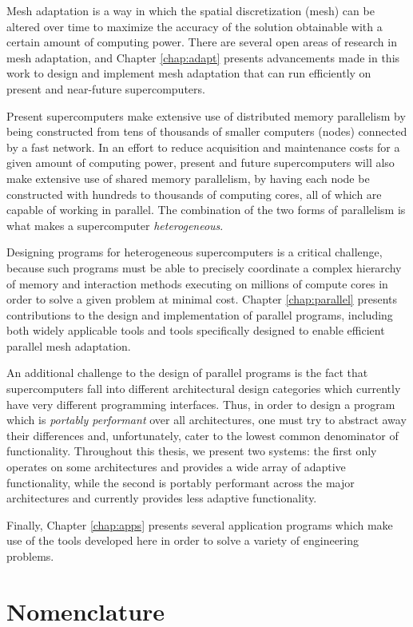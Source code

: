 Mesh adaptation is a way in which the spatial discretization
(mesh) can be altered over time to maximize the accuracy
of the solution obtainable with a certain amount
of computing power.
There are several open areas of research in mesh adaptation,
and Chapter \ref{chap:adapt} presents advancements
made in this work to design and implement
mesh adaptation that can run efficiently on present
and near-future supercomputers.

Present supercomputers make extensive use of distributed
memory parallelism by being constructed from tens of thousands of
smaller computers (nodes) connected by a fast network.
In an effort to reduce acquisition and maintenance costs
for a given amount of computing power,
present and future supercomputers will also make extensive use
of shared memory parallelism, by having each node be constructed
with hundreds to thousands of computing cores, all of which
are capable of working in parallel.
The combination of the two forms of parallelism is what
makes a supercomputer \emph{heterogeneous}.

Designing programs for heterogeneous supercomputers is a critical
challenge, because such programs must be able to precisely coordinate
a complex hierarchy of memory and interaction methods executing on
millions of compute cores
in order to solve a given problem at minimal cost.
Chapter \ref{chap:parallel} presents contributions to
the design and implementation of parallel programs,
including both widely applicable tools and tools specifically
designed to enable efficient parallel mesh adaptation.

An additional challenge to the design of parallel programs
is the fact that supercomputers fall into different
architectural design categories which currently
have very different programming interfaces.
Thus, in order to design a program which is \emph{portably performant}
over all architectures, one must try to abstract away
their differences and, unfortunately, cater to the
lowest common denominator of functionality.
Throughout this thesis, we present two systems:
the first only operates on some architectures and provides
a wide array of adaptive functionality, while the second
is portably performant across the major architectures
and currently provides less adaptive functionality.

Finally, Chapter \ref{chap:apps} presents several
application programs which make use of the tools developed
here in order to solve a variety of engineering problems.

\section{Nomenclature}

